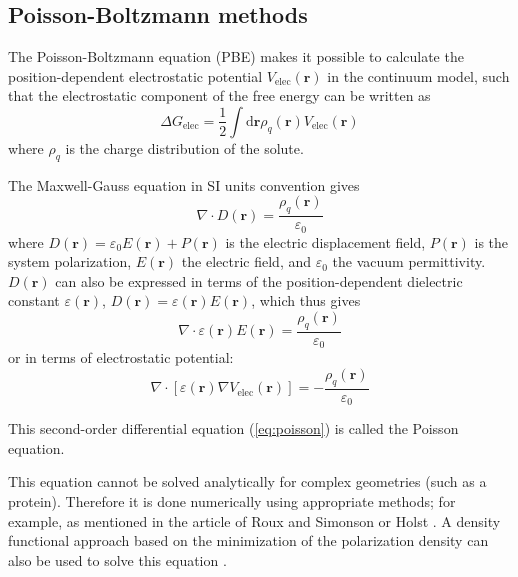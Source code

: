 \subsection{Poisson-Boltzmann methods\label{subsec:Poisson=002013Boltzmann-methods}}

The Poisson-Boltzmann equation (PBE) \citep{holst_1994_poisson} makes
it possible to calculate the position-dependent electrostatic potential
$V_{\mathrm{elec}}(\mathbf{r})$ in the continuum model, such that
the electrostatic component of the free energy can be written as
\begin{equation}
\Delta G_{\mathrm{elec}}=\frac{1}{2}\int\mathrm{d}\mathbf{r}\rho_{q}(\mathbf{r})V_{\mathrm{elec}}(\mathbf{r})
\end{equation}
where $\rho_{q}$ is the charge distribution of the solute.

The Maxwell-Gauss equation in SI units convention gives
\begin{equation}
\nabla\cdot D(\mathbf{r})=\dfrac{\rho_{q}(\mathbf{r})}{\varepsilon_{0}}
\end{equation}
where $D(\mathbf{r})=\varepsilon_{0}E(\mathbf{r})+P(\mathbf{r})$
is the electric displacement field, $P(\mathbf{r})$ is the system
polarization, $E(\mathbf{r})$ the electric field, and $\varepsilon_{0}$
the vacuum permittivity. $D(\mathbf{r})$ can also be expressed in
terms of the position-dependent dielectric constant $\varepsilon(\mathbf{r})$,
$D(\mathbf{r})=\varepsilon(\mathbf{r})E(\mathbf{r})$, which thus
gives
\begin{equation}
\nabla\cdot\varepsilon(\mathbf{r})E(\mathbf{r})=\dfrac{\rho_{q}(\mathbf{r})}{\varepsilon_{0}}
\end{equation}
or in terms of electrostatic potential:
\begin{equation}
\nabla\cdot\left[\varepsilon(\mathbf{r})\nabla V_{\mathrm{elec}}(\mathbf{r})\right]=-\dfrac{\rho_{q}(\mathbf{r})}{\varepsilon_{0}}\label{eq:poisson}
\end{equation}

This second-order differential equation (\ref{eq:poisson}) is called
the Poisson equation. 

This equation cannot be solved analytically for complex geometries
(such as a protein). Therefore it is done numerically using appropriate
methods; for example, as mentioned in the article of Roux and Simonson
\citep{roux_implicit_1999} or Holst \citep{holst_1994_poisson}.
A density functional approach based on the minimization of the polarization
density can also be used to solve this equation \citep{Marchi_2001,Levy_2005}.

